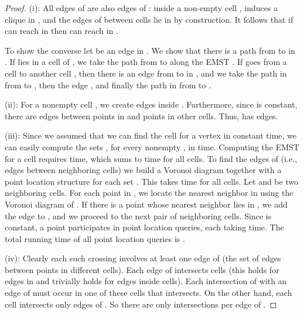 \documentclass[11pt,a4paper]{paper}
\begin{document}
\begin{proof}
(i): All edges of  are also edges of :
inside a non-empty cell ,  induces
a clique in , and the edges of  between cells
lie in  by construction. It follows that
if  can reach  in  then  can reach  in .

To show the converse let
 be an edge in . We show that there
is a path from  to  in .
If  lies in a cell  of ,
we take the path from  to  along the EMST .
If  goes from a cell  to
another cell , then
there is an edge  from
 to  in , and
we take the path in  from  to ,
then the edge , and finally the path
in  from  to .

(ii): For a nonempty cell ,
we create  edges inside . Furthermore,
since  is constant,
there are   edges between points in   and points in other cells.
Thus,  has  edges.

(iii): Since we assumed that we can find the cell for a vertex
 in constant time, we can easily compute the sets
, for every nonempty ,  in
 time.
Computing the EMST  for a cell  requires
 time, which sums to
   time for all cells.
To find the edges of  (i.e., edges between neighboring cells)
we build a Voronoi diagram together with a point location
structure for each set .
This takes   time for all cells.
Let  and  be two neighboring cells.
For each point in , we locate the nearest neighbor in
 using the Voronoi diagram of .
If there is a point  whose nearest neighbor
 lies in , we add the edge  to , and
we proceed to the next pair of neighboring cells.
Since  is constant,
a point participates in  point location queries, each taking
  time. The total running
time of all point location queries is .

(iv):
Clearly each such crossing involves at least one edge of  (the set of edges between points in different cells).
Each edge  of  intersects  cells  (this holds for edges in  and trivially holds for edges inside cells). Each intersection of  with an edge of  must occur in one of these  cells that  intersects.
On the other hand, each cell  intersects only  edges of . So there are only  intersections per edge of .
\end{proof}
\end{document}
